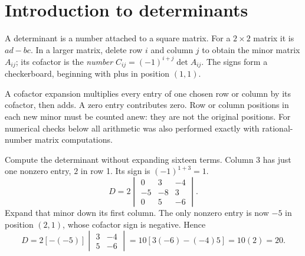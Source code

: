 \section{Introduction to determinants}
A determinant is a number attached to a square matrix. For a $2\times2$ matrix it is $ad-bc$. In a larger matrix, delete row $i$ and column $j$ to obtain the minor matrix $A_{ij}$; its cofactor is the \emph{number} $C_{ij}=(-1)^{i+j}\det A_{ij}$. The signs form a checkerboard, beginning with plus in position $(1,1)$.

A cofactor expansion multiplies every entry of one chosen row or column by its cofactor, then adds. A zero entry contributes zero. Row or column positions in each new minor must be counted anew: they are not the original positions. For numerical checks below all arithmetic was also performed exactly with rational-number matrix computations.

\goal Compute the determinant without expanding sixteen terms.
\idea Column 3 has just one nonzero entry, $2$ in row 1. Its sign is $(-1)^{1+3}=1$.
\[
 D=2\begin{vmatrix}0&3&-4\\-5&-8&3\\0&5&-6\end{vmatrix}.
\]
Expand that minor down its first column. The only nonzero entry is now $-5$ in position $(2,1)$, whose cofactor sign is negative. Hence
\[
 D=2[-(-5)]\begin{vmatrix}3&-4\\5&-6\end{vmatrix}
 =10[3(-6)-(-4)5]=10(2)=20.
\]

